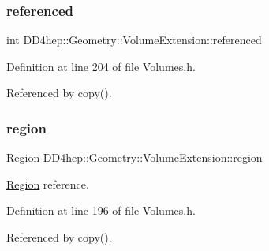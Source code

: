 \hypertarget{class_d_d4hep_1_1_geometry_1_1_volume_extension_aa73b0b45a2b7112a60e9616da6edcde4}{}\label{class_d_d4hep_1_1_geometry_1_1_volume_extension_aa73b0b45a2b7112a60e9616da6edcde4} 
\subsubsection{\texorpdfstring{referenced}{referenced}}
{\footnotesize\ttfamily int D\+D4hep\+::\+Geometry\+::\+Volume\+Extension\+::referenced}



Definition at line 204 of file Volumes.\+h.



Referenced by copy().

\hypertarget{class_d_d4hep_1_1_geometry_1_1_volume_extension_ac4303caba2a748fd25e8c986c8001096}{}\label{class_d_d4hep_1_1_geometry_1_1_volume_extension_ac4303caba2a748fd25e8c986c8001096} 
\subsubsection{\texorpdfstring{region}{region}}
{\footnotesize\ttfamily \hyperlink{class_d_d4hep_1_1_geometry_1_1_region}{Region} D\+D4hep\+::\+Geometry\+::\+Volume\+Extension\+::region}



\hyperlink{class_d_d4hep_1_1_geometry_1_1_region}{Region} reference. 



Definition at line 196 of file Volumes.\+h.



Referenced by copy().

\hypertarget{class_d_d4hep_1_1_geometry_1_1_volume_extension_a3b0ac7f31e5c962f0eb479c24d4c72ea}{}\label{class_d_d4hep_1_1_geometry_1_1_volume_extension_a3b0ac7f31e5c962f0eb479c24d4c72ea} 
